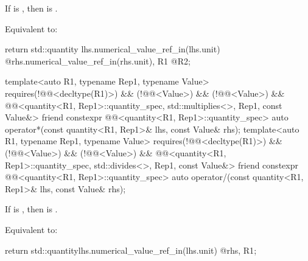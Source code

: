 \begin{itemdescr}
\pnum
\expects
If  is \tcode{/}, then  is .

\pnum
\effects
Equivalent to:
\begin{codeblock}
return std::quantity{
  lhs.numerical_value_ref_in(lhs.unit) @\atsign@ rhs.numerical_value_ref_in(rhs.unit), R1 @\atsign@ R2};
\end{codeblock}
\end{itemdescr}

\begin{itemdecl}
template<auto R1, typename Rep1, typename Value>
  requires(!@@<decltype(R1)>) &&
          (!@@<Value>) && (!@@<Value>) &&
          @@<quantity<R1, Rep1>::quantity_spec, std::multiplies<>, Rep1, const Value&>
friend constexpr @@<quantity<R1, Rep1>::quantity_spec> auto operator*(const quantity<R1, Rep1>& lhs,
                                                                               const Value& rhs);
template<auto R1, typename Rep1, typename Value>
  requires(!@@<decltype(R1)>) &&
          (!@@<Value>) && (!@@<Value>) &&
          @@<quantity<R1, Rep1>::quantity_spec, std::divides<>, Rep1, const Value&>
friend constexpr @@<quantity<R1, Rep1>::quantity_spec> auto operator/(const quantity<R1, Rep1>& lhs,
                                                                               const Value& rhs);
\end{itemdecl}

\begin{itemdescr}
\pnum
\expects
If  is \tcode{/}, then  is .

\pnum
\effects
Equivalent to:
\begin{codeblock}
return std::quantity{lhs.numerical_value_ref_in(lhs.unit) @\atsign@ rhs, R1};
\end{codeblock}
\end{itemdescr}

